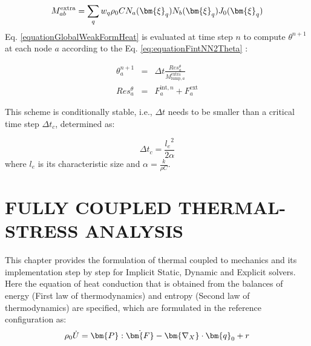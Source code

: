 \documentclass[oneside,11pt,times]{book}
\begin{document}
\begin{equation}
\begin{aligned}
\centering
M_{ab}^{\text{extra}}=\sum_q w_q \rho_0 C N_a(\bm{\xi}_q) N_b(\bm{\xi}_q) J_0(\bm{\xi}_q)
\end{aligned}
\label{equationMassMatExp}
\end{equation}
Eq. \eqref{equationGlobalWeakFormHeat} is evaluated at time step $n$ to compute $\theta^{n+1}$ at each node $a$ according to the Eq. \eqref{eq:equationFintNN2Theta} :

\begin{eqnarray}
\theta^{n+1}_a & = & \Delta t \frac{Res^{\theta}_{a}}{M_{\text{lump},a}^{\text{extra}}}\\\label{eq:PhiNNExp1}
Res^{\theta}_{a} & = & F^{\text{int},n}_a + F^{\text{ext}}_a\label{eq:PhiNNExp2}
\end{eqnarray}

This scheme is conditionally stable, i.e., $\Delta t$ needs to be smaller than a critical time step $\Delta t_c$, determined as:

\begin{equation}
  \Delta t_c = \frac{{l_e}^2}{2 \alpha}
\end{equation}
where $l_e$ is its characteristic size and $\alpha=\frac{k}{\rho C}$.
\section{FULLY COUPLED THERMAL-STRESS ANALYSIS}

This chapter provides the formulation of thermal coupled to mechanics and its implementation step by step for Implicit Static, Dynamic and Explicit solvers.
\\

Here the equation of heat conduction that is obtained from the balances of energy (First law of thermodynamics) and entropy (Second law of thermodynamics) are specified, which are formulated in the reference configuration as:
\begin{equation}
\begin{aligned}
\centering
\rho_0 \dot{U}=\bm{P}:\dot{\bm{F}}-\bm{\nabla_{X}}\cdot\bm{q}_0+r
\end{aligned}
\label{firstlaw}
\end{equation}
\end{document}
